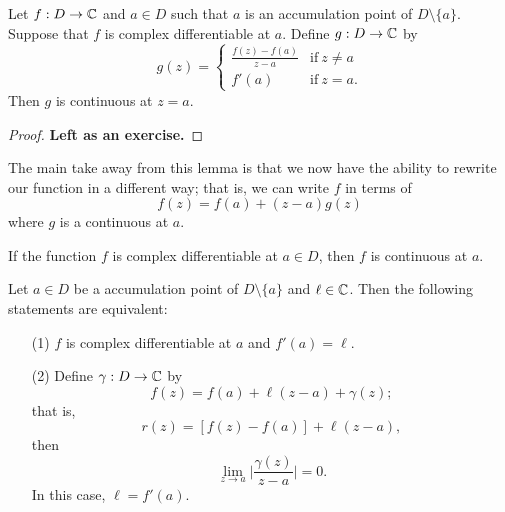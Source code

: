 \documentclass[a4paper]{report}
\begin{document}
\begin{lemma}
    Let \( f: D \to \mathbb{C}  \) and \( a \in D  \) such that \( a  \) is an accumulation point of \( D \setminus  \{ a \}  \). Suppose that \( f  \) is complex differentiable at \( a  \). Define \( g: D \to \mathbb{C}  \) by
    \[  g(z) = 
    \begin{cases}
        \frac{ f(z) - f(a) }{  z-  a  }  &\text{if} \ z \neq a \\
        f'(a) &\text{if} \ z = a. 
    \end{cases} \]
    Then \( g  \) is continuous at \( z= a  \). 
\end{lemma}
\begin{proof}
\textbf{Left as an exercise.}
\end{proof}
The main take away from this lemma is that we now have the ability to rewrite our function in a different way; that is,
we can write \( f  \) in terms of 
\[ f(z) = f(a) + (z-a)g(z) \]
where \( g  \) is a continuous at \( a  \).

\begin{corollary}
   If the function \( f  \) is complex differentiable at \( a \in D  \), then \( f  \) is continuous at \( a  \).
\end{corollary}

\begin{problem}
    Let \( a \in D  \) be a accumulation point of \( D \setminus  \{ a  \}  \) and \( \ell \in \mathbb{C}  \). Then the following statements are equivalent:
    \begin{enumerate}
        \item[(1)] \( f  \) is complex differentiable at \( a  \) and \( f'(a) = \ell \).
        \item[(2)] Define \( \gamma : D \to \mathbb{C}  \) by
            \[  f(z) = f(a) + \ell(z-a) + \gamma(z); \]
            that is, 
            \[  r(z) = [f(z) - f(a)] + \ell(z-a), \]
            then 
        \[  \lim_{ z \to a } \Big|  \frac{ \gamma(z) }{ z - a  } \Big|  = 0.  \]
            In this case, \( \ell = f'(a) \).
    \end{enumerate}
\end{problem}
\end{document}
